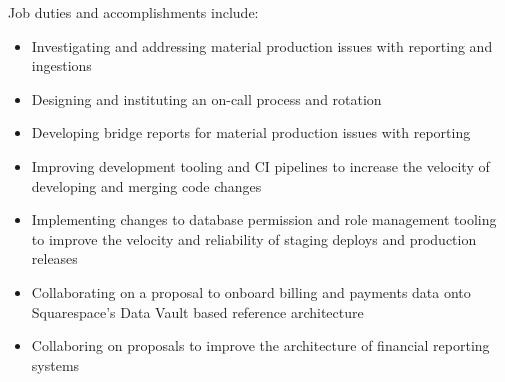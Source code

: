 \normalsize
Job duties and accomplishments include:
\small
\begin{itemize}
    \item Investigating and addressing material production issues with reporting
    and ingestions
    \item Designing and instituting an on-call process and rotation
    \item Developing bridge reports for material production issues with
    reporting
    \item Improving development tooling and CI pipelines to increase the
    velocity of developing and merging code changes
    \item Implementing changes to database permission and role management
    tooling to improve the velocity and reliability of staging deploys and
    production releases
    \item Collaborating on a proposal to onboard billing and payments data onto
    Squarespace's Data Vault based reference architecture
    \item Collaboring on proposals to improve the architecture of financial reporting systems
\end{itemize}
\normalsize
\medskip
